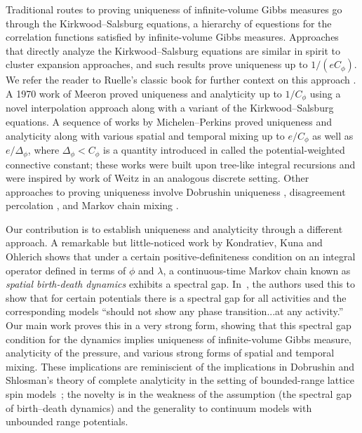 \documentclass[10pt]{amsart}
\theoremstyle{definition}
\theoremstyle{remark}
\begin{document}
	Traditional routes to proving uniqueness of infinite-volume Gibbs measures go through the Kirkwood--Salsburg equations, a hierarchy of equestions for the correlation functions satisfied by infinite-volume Gibbs measures.  Approaches that directly analyze the Kirkwood--Salsburg equations are similar in spirit to cluster expansion approaches, and such results prove uniqueness up to $1/(e C_\phi)$. 
	We refer the reader to Ruelle's classic book for further context on this approach \cite{ruelle1969statistical}.  A 1970 work of Meeron \cite{meeron1970bounds} proved uniqueness and analyticity up to $1/C_\phi$ using a novel interpolation approach along with a variant of the Kirkwood--Salsburg equations.  A sequence of works by Michelen--Perkins \cite{michelen2022strong,michelen2023analyticity,michelen2025potential} proved uniqueness and analyticity along with various spatial and temporal mixing up to  $e/C_\phi$ as well as $e/\Delta_\phi$, where $\Delta_\phi < C_\phi$ is a quantity introduced in \cite{michelen2025potential} called the potential-weighted connective constant; these works were built upon tree-like integral recursions and were inspired by work of Weitz \cite{Wei06} in an analogous discrete setting.  Other approaches to proving uniqueness involve Dobrushin uniqueness \cite{houdebart2022explicit},    disagreement percolation \cite{betsch2023uniqueness,dereudre2019introduction,hofertemel2019disagreement}, and Markov chain mixing \cite{helmuth2022correlation}.
	
	
	
	Our contribution is to establish uniqueness and analyticity through a different approach.  A remarkable but little-noticed work by Kondratiev, Kuna and Ohlerich \cite{kondratiev2013spectral} shows that under a certain positive-definiteness condition on an integral operator defined in terms of $\phi$ and $\lambda$, a continuous-time Markov chain known as \emph{spatial birth-death dynamics} exhibits a spectral gap.  
	In~\cite{kondratiev2013spectral}, the authors used this  to show that for certain potentials there is a spectral gap for all activities and the corresponding models ``should not show any phase transition...at any activity.''  
	Our main work {proves this in a very strong form}, showing that this spectral gap condition for the dynamics implies uniqueness of infinite-volume Gibbs measure, analyticity of the pressure, and various strong forms of spatial and temporal mixing.  {These implications are reminiscient of the implications in Dobrushin and Shlosman's theory of complete analyticity in the setting of bounded-range lattice spin models~\cite{dobrushin1985completely}; the novelty is in the weakness of the assumption (the spectral gap of birth--death dynamics) and the generality to continuum models with unbounded range potentials.}
	
\end{document}
